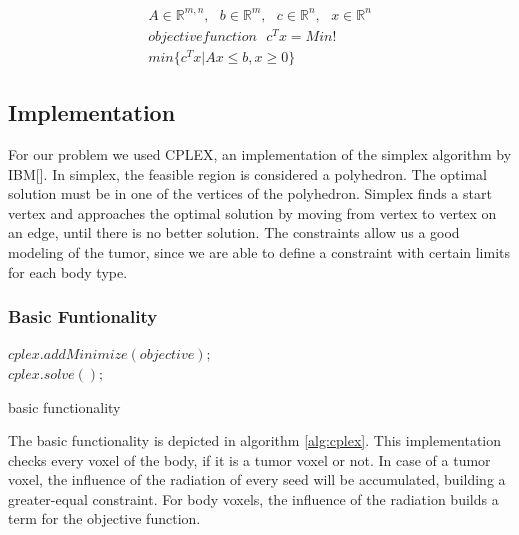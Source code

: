 \documentclass[12pt]{article}
\begin{document}
 \begin{equation}
 \label{eq:LPMatrix}
 \begin{aligned}
 A \in \mathbb{R}^{m,n}, \ \ \ b \in \mathbb{R}^m, \ \ \ c \in \mathbb{R}^n, \ \ \ x \in \mathbb{R}^n \\
 objective function \ \ \ c^Tx = Min! \\
 min\{c^Tx|Ax \leq b, x \geq 0\}
\end{aligned}
 \end{equation}
 
 
 
 \subsection{Implementation}
 
For our problem we used CPLEX, an implementation of the simplex algorithm by IBM[\cite{cplex}]. In simplex, the feasible region is considered a polyhedron. The optimal solution must be in one of the vertices of the polyhedron. Simplex finds a start vertex and approaches the optimal solution by moving from vertex to vertex on an edge, until there is no better solution.
The constraints allow us a good modeling of the tumor, since we are able to define a constraint with certain limits for each body type.

\subsubsection{Basic Funtionality}

\begin{algorithm}[H]
\label{alg:cplex}
  $cplex.addMinimize(objective);$\\
  $cplex.solve();$
 \caption{basic functionality}
 \end{algorithm}

The basic functionality is depicted in algorithm \ref{alg:cplex}. This implementation checks every voxel of the body, if it is a tumor voxel or not. In case of a tumor voxel, the influence of the radiation of every seed will be accumulated, building a greater-equal constraint. For body voxels, the influence of the radiation builds a term for the objective function. 
\end{document}
